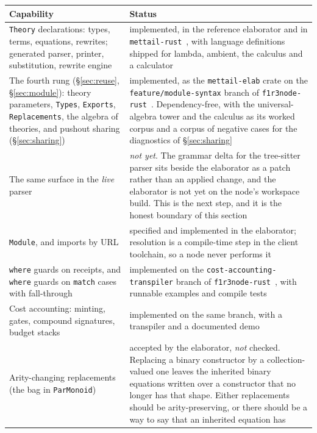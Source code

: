 \begin{center}
\small
\begin{tabular}{@{}L{0.40\textwidth}L{0.52\textwidth}@{}}
\toprule
\textbf{Capability} & \textbf{Status} \\
\midrule
\texttt{Theory} declarations: types, terms, equations, rewrites; generated
parser, printer, substitution, rewrite engine &
implemented, in the reference elaborator and in
\texttt{mettail-rust}~\cite{mettailrust}, with language definitions shipped for
lambda, ambient, the \rhoc{} calculus and a calculator \\[3pt]
The fourth rung (\S\ref{sec:reuse}, \S\ref{sec:module}): theory parameters,
\texttt{Types}, \texttt{Exports}, \texttt{Replacements}, the algebra of
theories, and pushout sharing (\S\ref{sec:sharing}) &
implemented, as the \texttt{mettail-elab} crate on the
\texttt{feature/module-syntax} branch of
\texttt{f1r3node-rust}~\cite{modulesyntax}. Dependency-free, with the
universal-algebra tower and the \rhoc{} calculus as its worked corpus and a
corpus of negative cases for the diagnostics of \S\ref{sec:sharing} \\[3pt]
The same surface in the \emph{live} parser &
\emph{not yet}. The grammar delta for the tree-sitter parser sits beside the
elaborator as a patch rather than an applied change, and the elaborator is not
yet on the node's workspace build. This is the next step, and it is the honest
boundary of this section \\[3pt]
\texttt{Module}, and imports by URL &
specified and implemented in the elaborator; resolution is a compile-time step
in the client toolchain, so a node never performs it \\[3pt]
\texttt{where} guards on receipts, and \texttt{where} guards on \texttt{match}
cases with fall-through &
implemented on the \texttt{cost-accounting-transpiler} branch of
\texttt{f1r3node-rust}~\cite{f1r3node}, with runnable examples and compile tests \\[3pt]
Cost accounting: minting, gates, compound signatures, budget stacks &
implemented on the same branch, with a transpiler and a documented demo \\[3pt]
Arity-changing replacements (the bag in \texttt{ParMonoid}) &
accepted by the elaborator, \emph{not} checked. Replacing a binary constructor
by a collection-valued one leaves the inherited binary equations written over a
constructor that no longer has that shape. Either replacements should be
arity-preserving, or there should be a way to say that an inherited equation has

\end{tabular}
\end{center}
